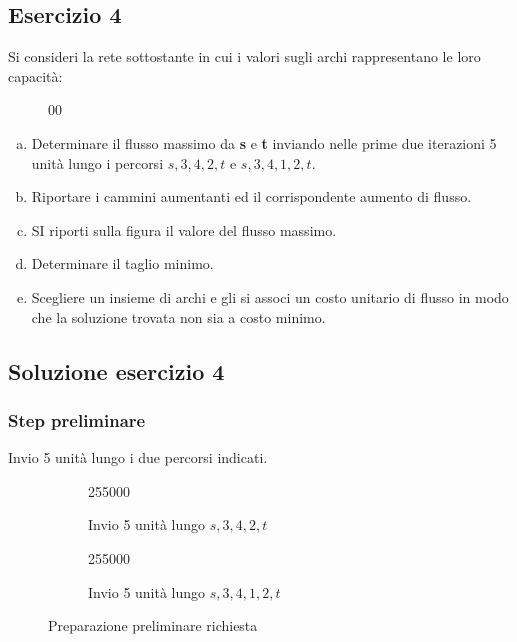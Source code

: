 \documentclass[\main/main.tex]{subfiles}
\def\redFlag{25500}
\def\blackFlag{0}
\newcommand{\currentGraphPreloader}[9]{
  \def\currentGraphArgI{#1}%
  \def\currentGraphArgII{#2}%
  \def\currentGraphArgIII{#3}%
  \def\currentGraphArgIV{#4}%
  \def\currentGraphArgV{#5}%
  \def\currentGraphArgVI{#6}%
  \def\currentGraphArgVII{#7}%
  \def\currentGraphArgVIII{#8}%
  \def\currentGraphArgIX{#9}%
  \secondCurrentGraphPreloader
}
\newcommand{\secondCurrentGraphPreloader}[9]{
  \def\currentGraphArgX{#1}%
  \def\currentColorI{#2}%
  \def\currentColorII{#3}%
  \def\currentColorIII{#4}%
  \def\currentColorIV{#5}%
  \def\currentColorV{#6}%
  \def\currentColorVI{#7}%
  \def\currentColorVII{#8}%
  \def\currentColorVIII{#9}%
  \currentGraph
}
\begin{document}
\subsection{Esercizio 4}
Si consideri la rete sottostante in cui i valori sugli archi rappresentano le loro capacità:

\begin{figure}
  \currentGraphPreloader
  {0}{0}{0}{0}{0}
  {0}{0}{0}{0}{0}
  {\blackFlag}{\blackFlag}{\blackFlag}{\blackFlag}{\blackFlag}
  {\blackFlag}{\blackFlag}{\blackFlag}{\blackFlag}{\blackFlag}
\end{figure}

\begin{enumerate}[a)]
  \item Determinare il flusso massimo da \textbf{s} e \textbf{t} inviando nelle prime due iterazioni 5 unità lungo i percorsi $s,3,4,2,t$ e $s,3,4,1,2,t$.
  \item Riportare i cammini aumentanti ed il corrispondente aumento di flusso.
  \item SI riporti sulla figura il valore del flusso massimo.
  \item Determinare il taglio minimo.
  \item Scegliere un insieme di archi e gli si associ un costo unitario di flusso in modo che la soluzione trovata non sia a costo minimo.
\end{enumerate}

\subsection{Soluzione esercizio 4}
\subsubsection*{Step preliminare}
Invio 5 unità lungo i due percorsi indicati.

\begin{figure}
  \begin{subfigure}{0.49\textwidth}
    \currentGraphPreloader
    {0}{5}{0}{5}{0}
    {5}{0}{0}{5}{0}
    {\blackFlag}{\redFlag}{\blackFlag}{\redFlag}{\blackFlag}
    {\redFlag}{\blackFlag}{\blackFlag}{\redFlag}{\blackFlag}
    \caption{Invio 5 unità lungo $s,3,4,2,t$}
  \end{subfigure}
  \begin{subfigure}{0.49\textwidth}
    \currentGraphPreloader
    {0}{10}{0}{10}{5}
    {5}{0}{5}{10}{0}
    {\blackFlag}{\redFlag}{\blackFlag}{\redFlag}{\redFlag}
    {\blackFlag}{\blackFlag}{\redFlag}{\redFlag}{\blackFlag}
    \caption{Invio 5 unità lungo $s,3,4,1,2,t$}
  \end{subfigure}
  \caption{Preparazione preliminare richiesta}
\end{figure}
\end{document}
